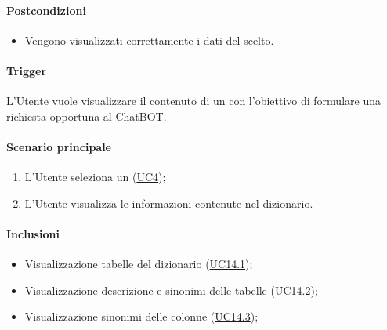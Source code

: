 \paragraph*{Postcondizioni}
\begin{itemize}
  \item Vengono visualizzati correttamente i dati del  scelto.
\end{itemize}

\paragraph*{Trigger}
L'Utente vuole visualizzare il contenuto di un  con l'obiettivo di formulare una richiesta opportuna al ChatBOT.

\paragraph*{Scenario principale}
\begin{enumerate}
  \item L'Utente seleziona un  (\hyperref[UC4]{UC4});
  \item L'Utente visualizza le informazioni contenute nel dizionario.
\end{enumerate}

\paragraph*{Inclusioni}
\begin{itemize}
  \item Visualizzazione tabelle del dizionario (\hyperref[UC14point1]{UC14.1});
  \item Visualizzazione descrizione e sinonimi delle tabelle (\hyperref[UC14point2]{UC14.2});
  \item Visualizzazione sinonimi delle colonne (\hyperref[UC14point3]{UC14.3});
\end{itemize}


